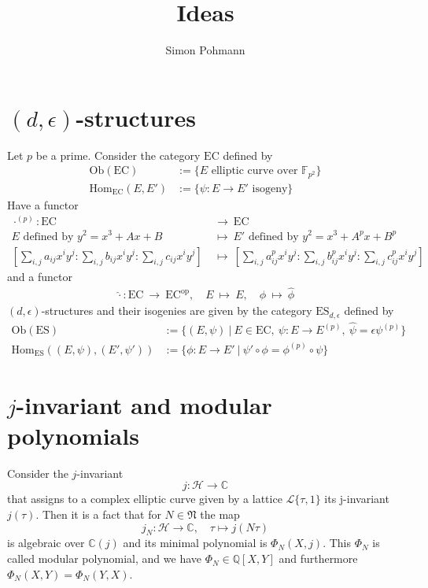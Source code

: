 \documentclass{scrartcl}
\title{Ideas}
\author{Simon Pohmann}
\newcommand{\N}{\mathbb{N}}
\newcommand{\F}{\mathbb{F}}
\newcommand{\C}{\mathbb{C}}
\newcommand{\Half}{\mathcal{H}}
\newcommand{\Lattice}{\mathcal{L}}
\renewcommand{\N}{\mathfrak{N}}
\theoremstyle{definition}
\begin{document}
\maketitle

\section{$(d, \epsilon)$-structures}

Let $p$ be a prime.
Consider the category $\mathrm{EC}$ defined by
\begin{align*}
    \mathrm{Ob}(\mathrm{EC}) &:= \{ \text{$E$ elliptic curve over $\F_{p^2}$} \} \\
    \mathrm{Hom}_{\mathrm{EC}}(E, E') &:= \{ \text{$\psi: E \to E'$ isogeny} \}
\end{align*}
Have a functor
\begin{align*}
    \cdot^{(p)}: \mathrm{EC} \ &\to \ \mathrm{EC} \\
    \text{$E$ defined by $y^2 = x^3 + Ax + B$} \ &\mapsto \ \text{$E'$ defined by $y^2 = x^3 + A^p x + B^p$} \\
    \left[ \sum_{i, j} a_{ij} x^i y^j : \sum_{i, j} b_{ij} x^i y^j : \sum_{i, j} c_{ij} x^i y^j \right] \ &\mapsto \ \left[ \sum_{i, j} a_{ij}^p x^i y^j : \sum_{i, j} b_{ij}^p x^i y^j : \sum_{i, j} c_{ij}^p x^i y^j \right]
\end{align*}
and a functor
\begin{align*}
    \hat{\cdot}: \mathrm{EC} \ \to \ \mathrm{EC}^{\mathrm{op}}, \quad E \ \mapsto \ E, \quad \phi \ \mapsto \ \hat{\phi}
\end{align*}
$(d, \epsilon)$-structures and their isogenies are given by the category $\mathrm{ES}_{d, \epsilon}$ defined by
\begin{align*}
    \mathrm{Ob}(\mathrm{ES}) &:= \{ (E, \psi) \ | \ E \in \mathrm{EC}, \ \psi: E \to E^{(p)}, \ \hat{\psi} = \epsilon\psi^{(p)} \} \\
    \mathrm{Hom}_{\mathrm{ES}}((E, \psi), (E', \psi')) &:= \{ \phi: E \to E' \ | \ \psi' \circ \phi = \phi^{(p)} \circ \psi \}
\end{align*}

\section{$j$-invariant and modular polynomials}

Consider the $j$-invariant
\begin{equation*}
    j: \Half \to \C
\end{equation*}
that assigns to a complex elliptic curve given by a lattice $\Lattice\{\tau, 1\}$ its j-invariant $j(\tau)$.
Then it is a fact that for $N \in \N$ the map
\begin{equation*}
    j_N: \Half \to \C, \quad \tau \mapsto j(N\tau)
\end{equation*}
is algebraic over $\C(j)$ and its minimal polynomial is $\Phi_N(X, j)$.
This $\Phi_N$ is called modular polynomial, and we have $\Phi_N \in \mathbb{Q}[X, Y]$ and furthermore $\Phi_N(X, Y) = \Phi_N(Y, X)$.
\end{document}
